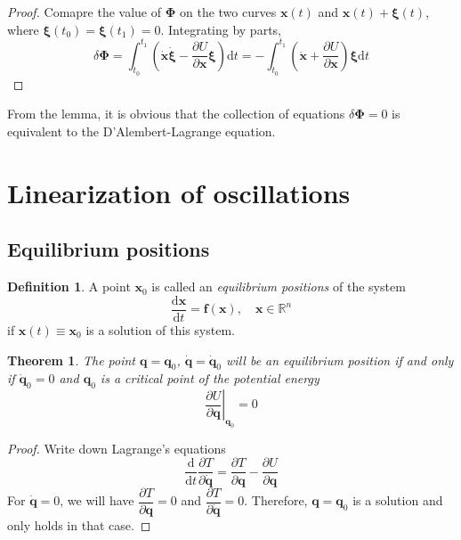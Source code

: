 \documentclass[conference]{IEEEtran}
\newtheorem{theorem}{Theorem}[section]
\theoremstyle{definition}
\newtheorem{definition}{Definition}[section]
\theoremstyle{remark}
\begin{document}
    \begin{proof}
        Comapre the value of $\bm{\Phi}$ on the two curves $\mathbf{x}(t)$ and $\mathbf{x}(t) + \bm{\xi}(t)$, where $\bm{\xi}(t_0) = \bm{\xi}(t_1) = 0$. Integrating by parts, 
        \begin{equation*}
            \delta \bm{\Phi} = \int_{t_0}^{t_1} \left( \dot{\mathbf{x}} \dot{\bm{\xi}} - \dfrac{\partial U}{\partial \mathbf{x}} \bm{\xi} \right) \mathrm{d} t = -\int_{t_0}^{t_1} \left( \ddot{\mathbf{x}} + \dfrac{\partial U}{\partial \mathbf{x}} \right) \bm{\xi} \mathrm{d} t
        \end{equation*}
    \end{proof}

    From the lemma, it is obvious that the collection of equations $\delta \bm{\Phi} = 0$ is equivalent to the D'Alembert-Lagrange equation.

    \section{Linearization of oscillations}
    \subsection{Equilibrium positions}
    \begin{definition}
        A point $\mathbf{x}_0$ is called an \emph{equilibrium positions} of the system
        \begin{equation*}
            \dfrac{\mathrm{d} \mathbf{x}}{\mathrm{d} t} = \mathbf{f}(\mathbf{x}), \quad \mathbf{x} \in \mathbb{R}^n
        \end{equation*}
        if $\mathbf{x}(t) \equiv \mathbf{x}_0$ is a solution of this system.
    \end{definition}

    \begin{theorem}
        The point $\mathbf{q} = \mathbf{q}_0$, $\dot{\mathbf{q}} = \dot{\mathbf{q}}_0$ will be an equilibrium position if and only if $\dot{\mathbf{q}}_0 = 0$ and $\mathbf{q}_0$ is a critical point of the potential energy
        \begin{equation*}
            \left. \dfrac{\partial U}{\partial \mathbf{q}} \right|_{\mathbf{q}_0} = 0
        \end{equation*}
    \end{theorem}
    \begin{proof}
        Write down Lagrange's equations
        \begin{equation*}
            \dfrac{\mathrm{d}}{\mathrm{d} t} \dfrac{\partial T}{\partial \dot{\mathbf{q}}} = \dfrac{\partial T}{\partial \mathbf{q}} - \dfrac{\partial U}{\partial \mathbf{q}}
        \end{equation*}
        For $\dot{\mathbf{q}} = 0$, we will have $\dfrac{\partial T}{\partial \mathbf{q}} = 0$ and $\dfrac{\partial T}{\partial \dot{\mathbf{q}}} = 0$. Therefore, $\mathbf{q} = \mathbf{q}_0$ is a solution and only holds in that case.
    \end{proof}
\end{document}
